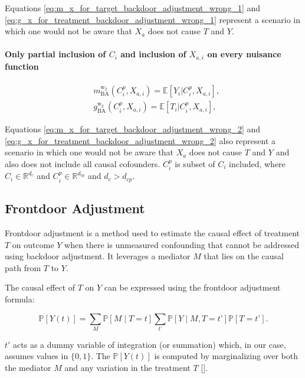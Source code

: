\documentclass{article}
\numberwithin{equation}{section}
\begin{document}
Equations \eqref{eq:m_x_for_target_backdoor_adjustment_wrong_1} and \eqref{eq:g_x_for_treatment_backdoor_adjustment_wrong_1} represent a scenario in which one would not be aware that $X_a$ does not cause $T$ and $Y$.

\paragraph{Only partial inclusion of $C_i$ and inclusion of $X_{a, i}$ on every nuisance function}
\label{par:backdoor_adjustment_wrong_2}

\begin{align}
    & m_{\text{BA}}^{\text{w}_2}(C^{p}_i, X_{a, i}) = \mathbb{E}[Y_i | C^{p}_i, X_{a, i}],
    \label{eq:m_x_for_target_backdoor_adjustment_wrong_2}
    \\
    & g_{\text{BA}}^{\text{w}_2}(C^{p}_i, X_{a, i}) = \mathbb{E}[T_i | C^{p}_i, X_{a, i}],
    \label{eq:g_x_for_treatment_backdoor_adjustment_wrong_2}
\end{align}

Equations \eqref{eq:m_x_for_target_backdoor_adjustment_wrong_2} and \eqref{eq:g_x_for_treatment_backdoor_adjustment_wrong_2} also represent a scenario in which one would not be aware that $X_a$ does not cause $T$ and $Y$ and also does not include all causal cofounders. $C^{p}_i$ is subset of $C_i$ included, where $C_i \in \mathbb{R}^{d_c}$ and $C^{p}_i \in \mathbb{R}^{d_{cp}}$ and $d_c > d_{cp}$.

\subsection{Frontdoor Adjustment}

Frontdoor adjustment is a method used to estimate the causal effect of treatment $T$ on outcome $Y$ when there is unmeasured confounding that cannot be addressed using backdoor adjustment. It leverages a mediator $M$ that lies on the causal path from $T$ to $Y$.

The causal effect of $T$ on $Y$ can be expressed using the frontdoor adjustment formula:

\begin{equation}
\mathbb{P}[Y(t)] = \sum_M \mathbb{P}[M \mid T=t] \sum_{t’} \mathbb{P}[Y \mid M, T=t’] \mathbb{P}[T=t’].
\end{equation}

$t'$ acts as a dummy variable of integration (or summation) which, in our case, assumes values in $\{0, 1\}$. The $\mathbb{P}[Y(t)]$ is computed by marginalizing over both the mediator $M$ and any variation in the treatment $T$ [\cite{Pearl2012}].
\end{document}
